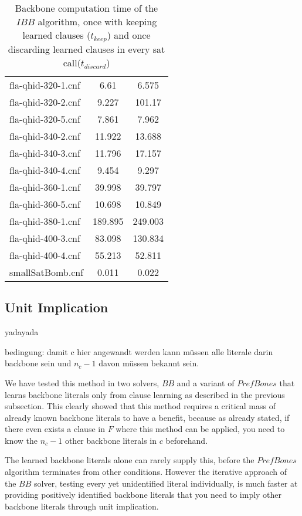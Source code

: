 \begin{wraptable}{R}{7cm}
\begin{tabular}{l| c c }
\fi
fla-qhid-320-1.cnf & 6.61 & 6.575 \\
fla-qhid-320-2.cnf & 9.227 & 101.17 \\
fla-qhid-320-5.cnf & 7.861 & 7.962 \\
fla-qhid-340-2.cnf & 11.922 & 13.688 \\
fla-qhid-340-3.cnf & 11.796 & 17.157 \\
fla-qhid-340-4.cnf & 9.454 & 9.297 \\
fla-qhid-360-1.cnf & 39.998 & 39.797 \\
fla-qhid-360-5.cnf & 10.698 & 10.849 \\
fla-qhid-380-1.cnf & 189.895 & 249.003 \\
fla-qhid-400-3.cnf & 83.098 & 130.834 \\
fla-qhid-400-4.cnf & 55.213 & 52.811 \\
smallSatBomb.cnf & 0.011 & 0.022 \\
\end{tabular}
\caption{Backbone computation time of the $IBB$ algorithm, once with keeping learned clauses ($t_{keep}$) and once discarding learned clauses in every sat call($t_{discard}$)}
\label{tab:learnedIbb} %
\end{wraptable}

\subsection{Unit Implication}
\label{subsec:unitImpl}

yadayada

bedingung: damit c hier angewandt werden kann müssen alle literale darin backbone sein und $n_c - 1$ davon müssen bekannt sein.


We have tested this method in two solvers, $BB$ and a variant of $PrefBones$ that learns backbone literals only from clause learning as described in the previous subsection. This clearly showed that this method requires a critical mass of already known backbone literals to have a benefit, because as already stated, if there even exists a clause in $F$ where this method can be applied, you need to know the $n_c - 1$ other backbone literals in $c$ beforehand.

The learned backbone literals alone can rarely supply this, before the $PrefBones$ algorithm terminates from other conditions. However the iterative approach of the $BB$ solver, testing every yet unidentified literal individually, is much faster at providing positively identified backbone literals that you need to imply other backbone literals through unit implication.

